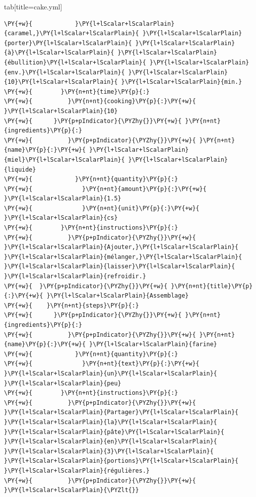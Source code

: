 \documentclass[a4paper,twoside]{article}
\begin{document}
\begin{tsdiv}{tab}[title=cake.yml]
\begin{tscode}[lang=yaml, engine=pygments]
\begin{Verbatim}[commandchars=\\\{\},breaklines, breakanywhere, commandchars=\\\{\}]
\PY{+w}{            }\PY{l+lScalar+lScalarPlain}{caramel,}\PY{l+lScalar+lScalarPlain}{ }\PY{l+lScalar+lScalarPlain}{porter}\PY{l+lScalar+lScalarPlain}{ }\PY{l+lScalar+lScalarPlain}{à}\PY{l+lScalar+lScalarPlain}{ }\PY{l+lScalar+lScalarPlain}{ébullition}\PY{l+lScalar+lScalarPlain}{ }\PY{l+lScalar+lScalarPlain}{env.}\PY{l+lScalar+lScalarPlain}{ }\PY{l+lScalar+lScalarPlain}{10}\PY{l+lScalar+lScalarPlain}{ }\PY{l+lScalar+lScalarPlain}{min.}
\PY{+w}{        }\PY{n+nt}{time}\PY{p}{:}
\PY{+w}{          }\PY{n+nt}{cooking}\PY{p}{:}\PY{+w}{ }\PY{l+lScalar+lScalarPlain}{10}
\PY{+w}{      }\PY{p+pIndicator}{\PYZhy{}}\PY{+w}{ }\PY{n+nt}{ingredients}\PY{p}{:}
\PY{+w}{          }\PY{p+pIndicator}{\PYZhy{}}\PY{+w}{ }\PY{n+nt}{name}\PY{p}{:}\PY{+w}{ }\PY{l+lScalar+lScalarPlain}{miel}\PY{l+lScalar+lScalarPlain}{ }\PY{l+lScalar+lScalarPlain}{liquide}
\PY{+w}{            }\PY{n+nt}{quantity}\PY{p}{:}
\PY{+w}{              }\PY{n+nt}{amount}\PY{p}{:}\PY{+w}{ }\PY{l+lScalar+lScalarPlain}{1.5}
\PY{+w}{              }\PY{n+nt}{unit}\PY{p}{:}\PY{+w}{ }\PY{l+lScalar+lScalarPlain}{cs}
\PY{+w}{        }\PY{n+nt}{instructions}\PY{p}{:}
\PY{+w}{          }\PY{p+pIndicator}{\PYZhy{}}\PY{+w}{ }\PY{l+lScalar+lScalarPlain}{Ajouter,}\PY{l+lScalar+lScalarPlain}{ }\PY{l+lScalar+lScalarPlain}{mélanger,}\PY{l+lScalar+lScalarPlain}{ }\PY{l+lScalar+lScalarPlain}{laisser}\PY{l+lScalar+lScalarPlain}{ }\PY{l+lScalar+lScalarPlain}{refroidir.}
\PY{+w}{  }\PY{p+pIndicator}{\PYZhy{}}\PY{+w}{ }\PY{n+nt}{title}\PY{p}{:}\PY{+w}{ }\PY{l+lScalar+lScalarPlain}{Assemblage}
\PY{+w}{    }\PY{n+nt}{steps}\PY{p}{:}
\PY{+w}{      }\PY{p+pIndicator}{\PYZhy{}}\PY{+w}{ }\PY{n+nt}{ingredients}\PY{p}{:}
\PY{+w}{          }\PY{p+pIndicator}{\PYZhy{}}\PY{+w}{ }\PY{n+nt}{name}\PY{p}{:}\PY{+w}{ }\PY{l+lScalar+lScalarPlain}{farine}
\PY{+w}{            }\PY{n+nt}{quantity}\PY{p}{:}
\PY{+w}{              }\PY{n+nt}{text}\PY{p}{:}\PY{+w}{ }\PY{l+lScalar+lScalarPlain}{un}\PY{l+lScalar+lScalarPlain}{ }\PY{l+lScalar+lScalarPlain}{peu}
\PY{+w}{        }\PY{n+nt}{instructions}\PY{p}{:}
\PY{+w}{          }\PY{p+pIndicator}{\PYZhy{}}\PY{+w}{ }\PY{l+lScalar+lScalarPlain}{Partager}\PY{l+lScalar+lScalarPlain}{ }\PY{l+lScalar+lScalarPlain}{la}\PY{l+lScalar+lScalarPlain}{ }\PY{l+lScalar+lScalarPlain}{pâte}\PY{l+lScalar+lScalarPlain}{ }\PY{l+lScalar+lScalarPlain}{en}\PY{l+lScalar+lScalarPlain}{ }\PY{l+lScalar+lScalarPlain}{3}\PY{l+lScalar+lScalarPlain}{ }\PY{l+lScalar+lScalarPlain}{portions}\PY{l+lScalar+lScalarPlain}{ }\PY{l+lScalar+lScalarPlain}{régulières.}
\PY{+w}{          }\PY{p+pIndicator}{\PYZhy{}}\PY{+w}{ }\PY{l+lScalar+lScalarPlain}{\PYZlt{}}

\end{Verbatim}
\end{tscode}
\end{tsdiv}
\end{document}
